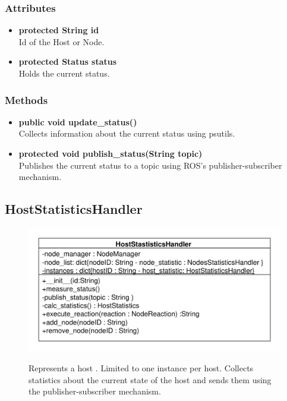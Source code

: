 \subsubsection{Attributes}
\begin{itemize}
	\item \textbf{protected String id}\\
	Id of the Host or Node.	
	\item \textbf{protected Status status}\\
	Holds the current status.
\end{itemize}

\subsubsection{Methods}
\begin{itemize}
\item \textbf{public void update\_status()}\\
			Collects information about the current status using psutils.
\item \textbf{protected void publish\_status(String topic)}\\
			Publishes the current status to a topic using ROS's publisher-subscriber mechanism.
\end{itemize}



\subsection{HostStatisticsHandler}
\begin{figure}[htbp]
	\begin{minipage}[t]{7cm}
		\vspace{0pt}
		\centering
		\includegraphics[scale=0.6]{./diagram_pictures/NodeInterface/HostStatisticsHandler.pdf}
	\end{minipage}
	\hfill
	\begin{minipage}[t]{5cm}
		\vspace{10pt}
		Represents a host . Limited to one instance per host. Collects statistics about the current state of the host and sends them using the 				publisher-subscriber mechanism.
	\end{minipage}
\end{figure}


